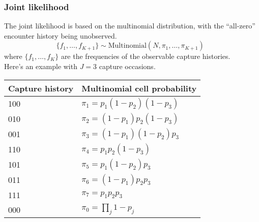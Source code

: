 \documentclass[color=usenames,dvipsnames]{beamer}\usepackage[]{graphicx}\usepackage[]{color}
\begin{document}
\begin{frame}
  \frametitle{Joint likelihood}
  \small
  The joint likelihood is based on the multinomial distribution, with
  the ``all-zero'' encounter history being unobserved. \\  
  \begin{equation*}
    \{f_1, \dots, f_{K+1}\} \sim \mathrm{Multinomial}(N, \pi_1, \dots, \pi_{K+1}) \;\;
  \end{equation*}
  where $\{f_1, \dots, f_K\}$ are the frequencies of the observable capture
  histories. \\
  \vfill
  Here's an example with $J=3$ capture occasions.  \\
  \vfill
  \centering
    \begin{tabular}{ll}
      \hline
      Capture history       & Multinomial cell probability \\
      \hline
      100                   & $\pi_1=p_1(1-p_2)(1-p_3)$    \\
      010                   & $\pi_2=(1-p_1)p_2(1-p_3)$    \\
      001                   & $\pi_3=(1-p_1)(1-p_2)p_3$    \\
      110                   & $\pi_4=p_1p_2(1-p_3)$        \\
      101                   & $\pi_5=p_1(1-p_2)p_3$        \\
      011                   & $\pi_6=(1-p_1)p_2p_3$        \\
      111                   & $\pi_7 = p_1p_2p_3$          \\
      000                   & $\pi_0 = \prod_j 1-p_j$      \\
      \hline
    \end{tabular}
\end{frame}
\end{document}
